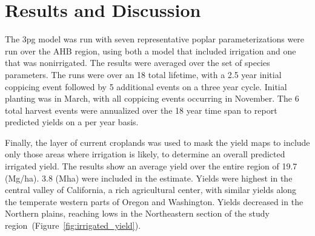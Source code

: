 \documentclass[preprint,12pt]{elsarticle}
\begin{document}
\section{Results and Discussion}

The \ac{3pg} model was run with seven representative poplar
parameterizations were run over the \ac{AHB} region, using both a
model that included irrigation and one that was nonirrigated.  The
results were averaged over the set of species parameters.  The runs
were over an 18 total lifetime, with a 2.5 year initial coppicing
event followed by 5 additional events on a three year cycle.  Initial
planting was in March, with all coppicing events occurring in
November.  The 6 total harvest events were annualized over the 18 year
time span to report predicted yields on a per year basis.

Finally, the layer of current croplands was used to mask the yield
maps to include only those areas where irrigation is likely, to
determine an overall predicted irrigated yield.  The results show an
average yield over the entire region of 19.7 (Mg/ha).  3.8 (Mha) were
included in the estimate.  Yields were highest in the central valley
of California, a rich agricultural center, with similar yields along
the temperate western parts of Oregon and Washington.  Yields
decreased in the Northern plains, reaching lows in the Northeastern
section of the study region~(Figure~\ref{fig:irrigated_yield}).
\end{document}
